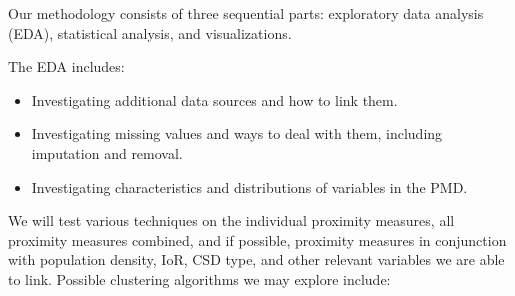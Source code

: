 \documentclass[11pt, a4paper]{article}
\begin{document}
Our methodology consists of three sequential parts: exploratory data analysis (EDA), statistical analysis, and visualizations.
\par
The EDA includes:
\begin{itemize}
\item Investigating additional data sources and how to link them. 
\item Investigating missing values and ways to deal with them, including imputation and removal.
\item  Investigating characteristics and distributions of variables in the PMD.
\end{itemize}

We will test various techniques on the individual proximity measures, all proximity measures combined, and if possible, proximity measures in conjunction with population density, IoR, CSD type, and other relevant variables we are able to link. Possible clustering algorithms we may explore include:
\end{document}
